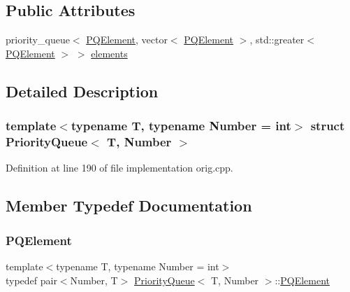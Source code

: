 \subsection*{Public Attributes}
\begin{DoxyCompactItemize}
\item 
priority\+\_\+queue$<$ \mbox{\hyperlink{struct_priority_queue_ae86a19aae3f9a32a1d76dfdab34eb70b}{P\+Q\+Element}}, vector$<$ \mbox{\hyperlink{struct_priority_queue_ae86a19aae3f9a32a1d76dfdab34eb70b}{P\+Q\+Element}} $>$, std\+::greater$<$ \mbox{\hyperlink{struct_priority_queue_ae86a19aae3f9a32a1d76dfdab34eb70b}{P\+Q\+Element}} $>$ $>$ \mbox{\hyperlink{struct_priority_queue_a289cc383607c83fe77a0d571cb06bb01}{elements}}
\end{DoxyCompactItemize}


\subsection{Detailed Description}
\subsubsection*{template$<$typename T, typename Number = int$>$\newline
struct Priority\+Queue$<$ T, Number $>$}



Definition at line 190 of file implementation orig.\+cpp.



\subsection{Member Typedef Documentation}
\mbox{\label{struct_priority_queue_ae86a19aae3f9a32a1d76dfdab34eb70b}} 
\subsubsection{\texorpdfstring{P\+Q\+Element}{PQElement}\hspace{0.1cm}{\footnotesize\ttfamily [1/2]}}
{\footnotesize\ttfamily template$<$typename T, typename Number = int$>$ \\
typedef pair$<$Number, T$>$ \mbox{\hyperlink{struct_priority_queue}{Priority\+Queue}}$<$ T, Number $>$\+::\mbox{\hyperlink{struct_priority_queue_ae86a19aae3f9a32a1d76dfdab34eb70b}{P\+Q\+Element}}}



